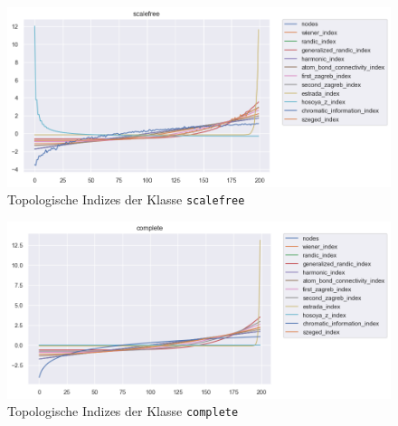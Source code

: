\begin{figure}[H]
    \centering
    \includegraphics[width=\textwidth]{images/30_results/scalefree-ti-comparison.png}
    \caption{Topologische Indizes der Klasse \texttt{scalefree}}
    \label{fig:big-ti-comparison-scalefree}
\end{figure}
\begin{figure}[H]
    \centering
    \includegraphics[width=\textwidth]{images/30_results/complete-ti-comparison.png}
    \caption{Topologische Indizes der Klasse \texttt{complete}}
    \label{fig:big-ti-comparison-complete}
\end{figure}

